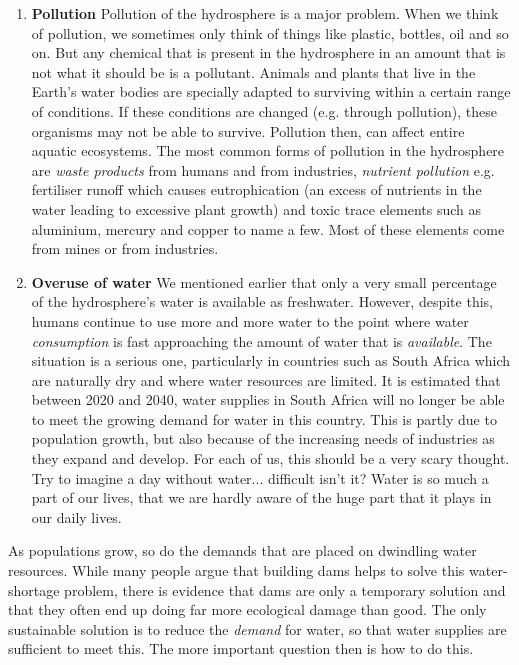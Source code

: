       \label{m38138*id342223}\begin{enumerate}[noitemsep, label=\textbf{\arabic*}. ] 
            \label{m38138*uid91}\item \textbf{Pollution}\newline
Pollution of the hydrosphere is a major problem. When we think of pollution, we sometimes only think of things like plastic, bottles, oil and so on. But any chemical that is present in the hydrosphere in an amount that is not what it should be is a pollutant. Animals and plants that live in the Earth's water bodies are specially adapted to surviving within a certain range of conditions. If these conditions are changed (e.g.\@{} through pollution), these organisms may not be able to survive. Pollution then, can affect entire aquatic ecosystems. The most common forms of pollution in the hydrosphere are \textsl{waste products} from humans and from industries, \textsl{nutrient pollution} e.g.\@{} fertiliser runoff which causes eutrophication (an excess of nutrients in the water leading to excessive plant growth) and toxic trace elements such as aluminium, mercury and copper to name a few. Most of these elements come from mines or from industries.
\label{m38138*uid87}\item \textbf{Overuse of water}\newline
We mentioned earlier that only a very small percentage of the hydrosphere's water is available as freshwater. However, despite this, humans continue to use more and more water to the point where water \textsl{consumption} is fast approaching the amount of water that is \textsl{available}. The situation is a serious one, particularly in countries such as South Africa which are naturally dry and where water resources are limited. It is estimated that between 2020 and 2040, water supplies in South Africa will no longer be able to meet the growing demand for water in this country. This is partly due to population growth, but also because of the increasing needs of industries as they expand and develop. For each of us, this should be a very scary thought. Try to imagine a day without water... difficult isn't it? Water is so much a part of our lives, that we are hardly aware of the huge part that it plays in our daily lives.
\end{enumerate}
As populations grow, so do the demands that are placed on dwindling water resources. While many people argue that building dams helps to solve this water-shortage problem, there is evidence that dams are only a temporary solution and that they often end up doing far more ecological damage than good. The only sustainable solution is to reduce the \textsl{demand} for water, so that water supplies are sufficient to meet this. The more important question then is how to do this. \pagebreak
